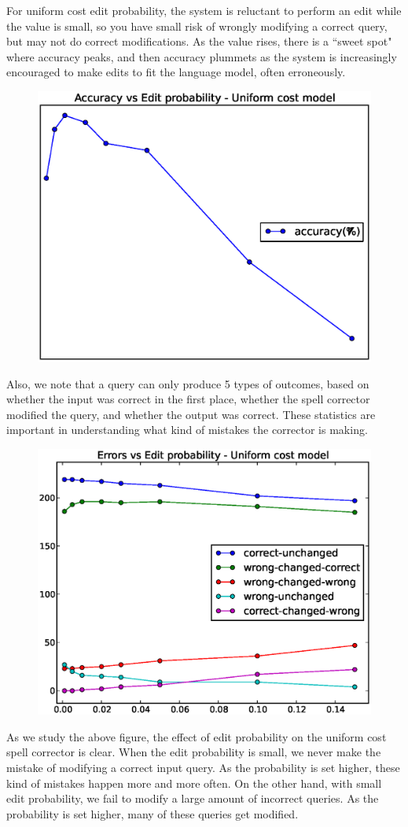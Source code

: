 \documentclass[10pt,twocolumn]{article}
\begin{document}
For uniform cost edit probability, the system is reluctant to perform an edit while the value is small, so you have small risk of wrongly modifying a correct query, but may not do correct modifications. As the value rises, there is a ``sweet spot" where accuracy peaks, and then accuracy plummets as the system is increasingly encouraged to make edits to fit the language model, often erroneously.
\begin{figure}[H]
\includegraphics[width=0.9\linewidth]{editprob}
\end{figure}
Also, we note that a query can only produce 5 types of outcomes, based on whether the input was correct in the first place, whether the spell corrector modified the query, and whether the output was correct. These statistics are important in understanding what kind of mistakes the corrector is making.
\begin{figure}[H]
\includegraphics[width=0.9\linewidth]{editprob_err}
\end{figure}
As we study the above figure, the effect of edit probability on the uniform cost spell corrector is clear. When the edit probability is small, we never make the mistake of modifying a correct input query. As the probability is set higher, these kind of mistakes happen more and more often. On the other hand, with small edit probability, we fail to modify a large amount of incorrect queries. As the probability is set higher, many of these queries get modified.



\end{document}
